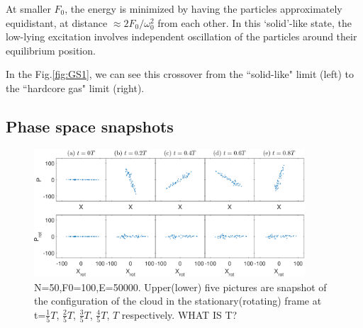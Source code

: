 \documentclass[aps,preprintnumbers,onecolumn,amsmath,amssymb,floatfix,pra]{revtex4-1}
\begin{document}
At smaller $F_0$, the energy is minimized by having the particles approximately equidistant, at
distance $\approx 2F_0/\omega_0^2$ from each other.  In this `solid'-like state, the low-lying
excitation involves independent oscillation of the particles around their equilibrium position.  

In the Fig.\ref{fig:GS1}, we can see this crossover from the ``solid-like" limit (left) to the
``hardcore gas" limit (right).


\subsection{Phase space snapshots}


\begin{figure}[h]
\includegraphics[width=0.9\textwidth]{ZhiyuPictures/stationary_and_rotating_frame_t=1-5_5T.eps}

\caption{N=50,F0=100,E=50000. Upper(lower) five pictures are snapshot of the configuration of the
  cloud in the stationary(rotating) frame at t=$\frac{1}{5}T$, $\frac{2}{5}T$, $\frac{3}{5}T$,
  $\frac{4}{5}T$, $T$ respectively.
WHAT IS T?
}
\label{fig:Breathingfrequency2_0}
\end{figure}
\end{document}
